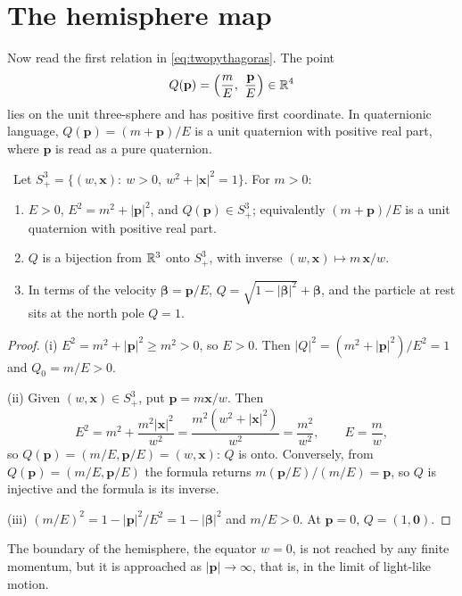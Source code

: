 \section{The hemisphere map}

Now read the first relation in \eqref{eq:twopythagoras}. The point
\begin{equation}\label{eq:hemimap}
Q(\mathbf p)=\Bigl(\frac mE,\ \frac{\mathbf p}{E}\Bigr)\in\mathbb{R}^4
\end{equation}
lies on the unit three-sphere and has positive first coordinate. In quaternionic language, $Q(\mathbf p)=(m+\mathbf p)/E$ is a unit quaternion with positive real part, where $\mathbf p$ is read as a pure quaternion.

\begin{theorem}\label{thm:hemibij}\ver\
Let $S^3_+=\{(w,\mathbf x):\ w>0,\ w^2+|\mathbf x|^2=1\}$. For $m>0$:
\begin{enumerate}[label=(\roman*)]
\item $E>0$, $E^2=m^2+|\mathbf p|^2$, and $Q(\mathbf p)\in S^3_+$; equivalently $(m+\mathbf p)/E$ is a unit quaternion with positive real part.
\item $Q$ is a bijection from $\mathbb{R}^3$ onto $S^3_+$, with inverse $(w,\mathbf x)\mapsto m\,\mathbf x/w$.
\item In terms of the velocity $\bm\beta=\mathbf p/E$, $Q=\sqrt{1-|\bm\beta|^2}+\bm\beta$, and the particle at rest sits at the north pole $Q=1$.
\end{enumerate}
\end{theorem}
\begin{proof}
(i) $E^2=m^2+|\mathbf p|^2\ge m^2>0$, so $E>0$. Then $|Q|^2=(m^2+|\mathbf p|^2)/E^2=1$ and $Q_0=m/E>0$.

(ii) Given $(w,\mathbf x)\in S^3_+$, put $\mathbf p=m\mathbf x/w$. Then
\[
E^2=m^2+\frac{m^2|\mathbf x|^2}{w^2}=\frac{m^2(w^2+|\mathbf x|^2)}{w^2}=\frac{m^2}{w^2},\qquad E=\frac mw,
\]
so $Q(\mathbf p)=(m/E,\mathbf p/E)=(w,\mathbf x)$: $Q$ is onto. Conversely, from $Q(\mathbf p)=(m/E,\mathbf p/E)$ the formula returns $m(\mathbf p/E)/(m/E)=\mathbf p$, so $Q$ is injective and the formula is its inverse.

(iii) $(m/E)^2=1-|\mathbf p|^2/E^2=1-|\bm\beta|^2$ and $m/E>0$. At $\mathbf p=0$, $Q=(1,\mathbf 0)$.
\end{proof}


The boundary of the hemisphere, the equator $w=0$, is not reached by any finite momentum, but it is approached as $|\mathbf p|\to\infty$, that is, in the limit of light-like motion.

